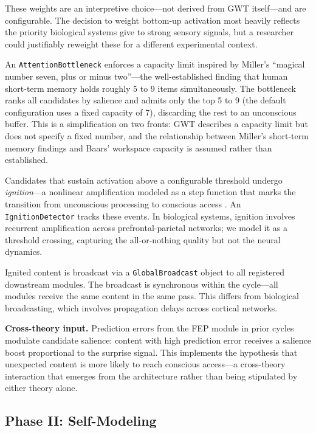 These weights are an interpretive choice---not derived from GWT itself---and are configurable. The decision to weight bottom-up activation most heavily reflects the priority biological systems give to strong sensory signals, but a researcher could justifiably reweight these for a different experimental context.

An \texttt{AttentionBottleneck} enforces a capacity limit inspired by Miller's \cite{miller1956} ``magical number seven, plus or minus two''---the well-established finding that human short-term memory holds roughly 5 to 9 items simultaneously. The bottleneck ranks all candidates by salience and admits only the top 5 to 9 (the default configuration uses a fixed capacity of 7), discarding the rest to an unconscious buffer. This is a simplification on two fronts: GWT describes a capacity limit but does not specify a fixed number, and the relationship between Miller's short-term memory findings and Baars' workspace capacity is assumed rather than established.

Candidates that sustain activation above a configurable threshold undergo \textit{ignition}---a nonlinear amplification modeled as a step function that marks the transition from unconscious processing to conscious access \cite{dehaene2001}. An \texttt{IgnitionDetector} tracks these events. In biological systems, ignition involves recurrent amplification across prefrontal-parietal networks; we model it as a threshold crossing, capturing the all-or-nothing quality but not the neural dynamics.

Ignited content is broadcast via a \texttt{GlobalBroadcast} object to all registered downstream modules. The broadcast is synchronous within the cycle---all modules receive the same content in the same pass. This differs from biological broadcasting, which involves propagation delays across cortical networks.

\textbf{Cross-theory input.} Prediction errors from the FEP module in prior cycles modulate candidate salience: content with high prediction error receives a salience boost proportional to the surprise signal. This implements the hypothesis that unexpected content is more likely to reach conscious access---a cross-theory interaction that emerges from the architecture rather than being stipulated by either theory alone.

\subsection{Phase II: Self-Modeling}

